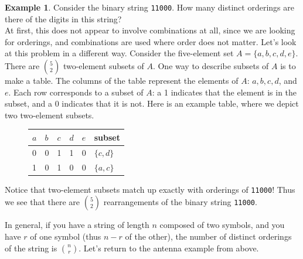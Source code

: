 \documentclass[12pt]{article}
\theoremstyle{definition}
\newtheorem*{example}{Example}
\theoremstyle{remark}
\begin{document}
\begin{example}Consider the binary string \texttt{11000}. How many distinct orderings are there of the digits in this string?\\

At first, this does not appear to involve combinations at all, since we are looking for orderings, and combinations are used where order does not matter. Let's look at this problem in a different way. Consider the five-element set $A = \{a, b, c, d, e\}$. There are $\binom{5}{2}$ two-element subsets of $A$. One way to describe subsets of $A$ is to make a table. The columns of the table represent the elements of $A$: $a, b, c, d$, and $e$. Each row corresponds to a subset of $A$: a 1 indicates that the element is in the subset, and a 0 indicates that it is not. Here is an example table, where we depict two two-element subsets.

\begin{figure}[H]
\centering
\label{twoelementsubsets}
\begin{tabular}{lllll|l}
$a$ & $b$ & $c$ & $d$ & $e$ & subset \\
\hline
0 & 0 & 1 & 1 & 0 & $\{c, d\}$\\
1 & 0 & 1 & 0 & 0 & $\{a, c\}$\\
\end{tabular}
\end{figure}

Notice that two-element subsets match up exactly with orderings of \texttt{11000}! Thus we see that there are $\binom{5}{2}$ rearrangements of the binary string \texttt{11000}.
\end{example}

In general, if you have a string of length $n$ composed of two symbols, and you have $r$ of one symbol (thus $n-r$ of the other), the number of distinct orderings of the string is $\binom{n}{r}$. Let's return to the antenna example from above.
\end{document}
